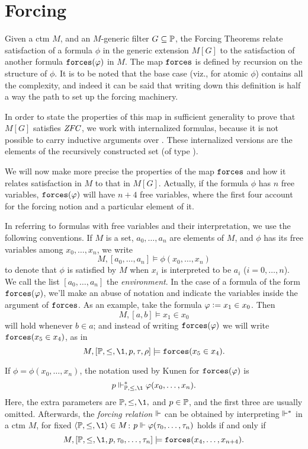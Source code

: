 \section{Forcing}
\label{sec:forcing}

Given a ctm $M$, and an $M$-generic filter $G\subseteq\mathbb{P}$, the Forcing
Theorems relate satisfaction of a formula 
$\phi$ in the generic extension $M[G]$ to the satisfaction of another
formula $\mathop{\mathtt{forces}}(\varphi)$ in $M$. The map $\mathop{\mathtt{forces}}$ is defined by
recursion on 
the structure of $\phi$. It is to be noted that the base case (viz.,
for atomic $\phi$) contains all the complexity, and indeed it can be
said that writing down this definition is half
a way the path to set up the forcing machinery.
\medskip

\medskip

In order to state the properties of this map
in sufficient generality to prove that  $M[G]$ satisfies $\mathit{ZFC}$, we work with
internalized formulas, because it is not possible to carry inductive
arguments over \tyo. These internalized versions are the elements of
the recursively constructed set \formula{} (of type \tyi).

We will now make more precise the properties of the map
$\mathop{\mathtt{forces}}$ and how it relates satisfaction in $M$ to that in
$M[G]$. Actually, if the formula $\phi$ has $n$ free variables,
$\mathop{\mathtt{forces}}(\varphi)$ will have $n+4$ free variables, where the first four account
for the forcing notion and a particular element of it. 

In referring to formulas with free variables and their interpretation,
we use the following conventions. If  $M$ is a set, $a_0,\dots,a_n$
are elements of $M$, and $\phi$ has its free variables
among $x_0,\dots,x_n$, we write
\[
M,[a_0,\dots,a_n] \models \phi(x_0,\dots,x_n)
\]
to denote that $\phi$ is satisfied by $M$ when $x_i$ is interpreted
to be $a_i$ ($i=0,\dots,n$). We call the list $[a_0,\dots,a_n]$ the
\emph{environment}. In the case of a formula of the form
$\mathop{\mathtt{forces}}(\varphi)$, we'll make an abuse of notation and indicate the
variables inside the argument of $\mathop{\mathtt{forces}}$. As an example, take the
formula $\varphi\mathrel{\mathop:}= x_1\in x_0$. Then
\[
M,[a,b] \models x_1\in x_0
\]
will hold whenever $b\in a$; and instead of writing $\mathop{\mathtt{forces}}(\varphi)$
we will write $\mathop{\mathtt{forces}}(x_5\in x_4)$, as in
\[
M,[\PP,\leq,\1,p,\tau,\rho] \models \forceisa(x_5\in x_4).
\]

If
$\phi=\phi(x_0,\dots,x_n)$, the notation used by Kunen
\cite{kunen2011set,kunen1980} for $\mathop{\mathtt{forces}}(\varphi)$ is 
\[
p\forces_{\PP,\leq,\1}^* \phi(x_0,\dots,x_n).
\]
Here, the extra parameters are $\PP,\leq,\1,$ and $p\in\mathbb{P}$, and the
first three are usually omitted. %
Afterwards, the \emph{forcing relation}
$\Vdash$ can be obtained by 
interpreting $\Vdash^*$ in a ctm $M$, for fixed
$\lb\PP,\leq,\1\rb\in M$: $p\Vdash \varphi(\tau_0,\dots,\tau_n)$ holds
if and only if
\begin{equation}\label{eq:3}
M,[\PP,\leq,\1,p,\tau_0,\dots,\tau_n]\models \forceisa(x_4,\dots,x_{n+4}).
\end{equation}

